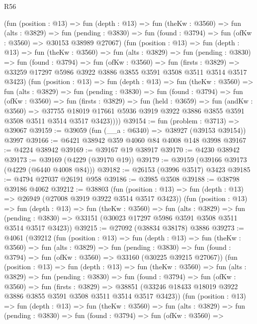 \begin{lexlean}{R56}
\begin{coremodule}
          (fun (position : @13) =>
          fun (depth : @13) =>
          fun (theKw : @3560) =>
          fun (alts : @3829) =>
          fun (pending : @3830) =>
          fun (found : @3794) => fun (ofKw : @3560) => @30153 @38989 @27067)
          (fun (position : @13) =>
          fun (depth : @13) =>
          fun (theKw : @3560) =>
          fun (alts : @3829) =>
          fun (pending : @3830) =>
          fun (found : @3794) =>
          fun (ofKw : @3560) =>
          fun (firsts : @3829) =>
          @33259 @17297 @5986 @3922 @3886 @3855 @3591 @3508 @3511 @3514 @3517 @3423)
          (fun (position : @13) =>
          fun (depth : @13) =>
          fun (theKw : @3560) =>
          fun (alts : @3829) =>
          fun (pending : @3830) =>
          fun (found : @3794) =>
          fun (ofKw : @3560) =>
          fun (firsts : @3829) =>
          fun (held : @3659) =>
          fun (andKw : @3560) =>
          @37755 @18019 @17661 @5936 @3919 @3922 @3886 @3855 @3591 @3508 @3511 @3514 @3517 @3423))))
@39154 := fun (problem : @3713) => @39067
@39159 := @39059 (fun (__a : @6340) => @38927 (@39153 @39154)) @3997
@39166 := @6421 @38942 @359 @4060 @84 @4008 @148 @3998
@39167 := @4224 @38942
@39169 := @39167 @19 @38917
@39170 := @4230 @38942
@39173 := @39169 (@4229 (@39170 @19))
@39179 := @39159 (@39166 @39173 (@4229 (@6440 @4008 @84)))
@39182 := @26153 (@3996 @3517) @3423
@39185 := @4794 @27037 @26191 @958
@39186 := @3985 @3508
@39188 := @38798 @39186 @4062
@39212 := @38803
    (fun (position : @13) => fun (depth : @13) => @26949 (@27008 @3919 @3922 @3514 @3517 @3423))
    (fun (position : @13) =>
    fun (depth : @13) =>
    fun (theKw : @3560) =>
    fun (alts : @3829) =>
    fun (pending : @3830) => @33151 (@30023 @17297 @5986 @3591 @3508 @3511 @3514 @3517 @3423))
@39215 := @27092 (@38834 @38178) @3886
@39273 := @4061
    (@39212
      (fun (position : @13) =>
      fun (depth : @13) =>
      fun (theKw : @3560) =>
      fun (alts : @3829) =>
      fun (pending : @3830) =>
      fun (found : @3794) => fun (ofKw : @3560) => @33160 (@30225 @39215 @27067))
      (fun (position : @13) =>
      fun (depth : @13) =>
      fun (theKw : @3560) =>
      fun (alts : @3829) =>
      fun (pending : @3830) =>
      fun (found : @3794) =>
      fun (ofKw : @3560) =>
      fun (firsts : @3829) =>
      @38851 (@33246 @18433 @18019 @3922 @3886 @3855 @3591 @3508 @3511 @3514 @3517 @3423))
      (fun (position : @13) =>
      fun (depth : @13) =>
      fun (theKw : @3560) =>
      fun (alts : @3829) =>
      fun (pending : @3830) =>
      fun (found : @3794) =>
      fun (ofKw : @3560) =>

\end{coremodule}
\end{lexlean}
